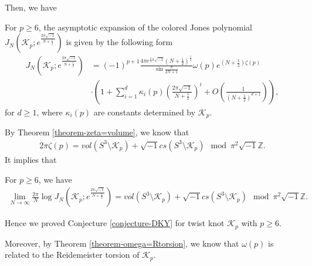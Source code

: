 \documentclass[12pt]{amsart}
\begin{document}
Then, we have
\begin{theorem}  \label{theorem-main}
  For $p\geq 6$, the asymptotic expansion of the colored Jones polynomial $J_N(\mathcal{K}_p;e^{\frac{2\pi \sqrt{-1}}{N+\frac{1}{2}}})$ is given by the following form
    \begin{align}
       J_N(\mathcal{K}_p;e^{\frac{2\pi \sqrt{-1}}{N+\frac{1}{2}}})&=(-1)^{p+1}\frac{4\pi e^{\frac{1}{4}\pi\sqrt{-1}}(N+\frac{1}{2})^{\frac{1}{2}}}{\sin\frac{\pi}{2N+1}}\omega(p)e^{(N+\frac{1}{2})\zeta(p)}\\\nonumber
       &\cdot\left(1+\sum_{i=1}^d\kappa_i(p)\left(\frac{2\pi\sqrt{-1}}{N+\frac{1}{2}}\right)^i+O\left(\frac{1}{(N+\frac{1}{2})^{d+1}}\right)\right),
    \end{align}
    for $d\geq 1$, where $\kappa_i(p)$ are constants determined by $\mathcal{K}_p$.
\end{theorem}
By Theorem  \ref{theorem-zeta=volume}, we know that
\begin{align}
     2\pi \zeta(p)= vol(S^3\setminus \mathcal{K}_p)+\sqrt{-1}cs(S^3\setminus \mathcal{K}_p) \mod \pi^2\sqrt{-1}\mathbb{Z}.
\end{align}
It implies that
\begin{corollary}
    For $p\geq 6$, we have
    \begin{align}
        \lim_{N\rightarrow \infty}\frac{2\pi}{N}\log J_N(\mathcal{K}_p;e^{\frac{2\pi \sqrt{-1}}{N+\frac{1}{2}}})=vol(S^3\setminus \mathcal{K}_p)+\sqrt{-1}cs(S^3\setminus \mathcal{K}_p) \mod \pi^2\sqrt{-1}\mathbb{Z}.
    \end{align}
\end{corollary}
Hence we proved Conjecture \ref{conjecture-DKY} for twist knot $\mathcal{K}_p$ with $p\geq 6$.  

Moreover, by Theorem \ref{theorem-omega=Rtorsion}, we know that $\omega(p)$ is related to the Reidemeister torsion of $\mathcal{K}_p$. 
\end{document}

